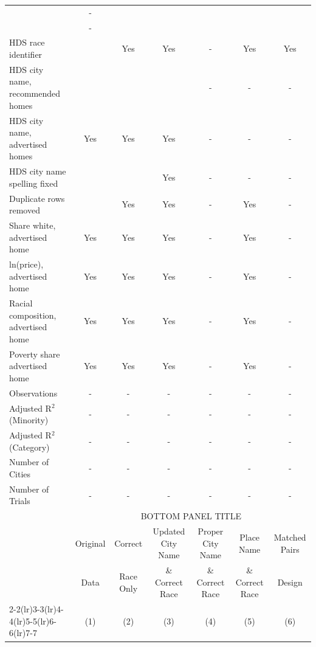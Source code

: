 \begin{table}[htbp]
{\begin{tabular}{l*{6}{c}}
                    &   -   &       &     &      &      &  \\
                    & -   &    &    &   &   &  \\
\midrule
HDS race identifier & & Yes & Yes & - & Yes & Yes \\
HDS city name, recommended homes &  &  & &- & - & -\\
HDS city name, advertised homes & Yes & Yes & Yes & - & - & -\\
HDS city name spelling fixed & & & Yes & - & - & -\\
Duplicate rows removed &  & Yes & Yes & - & Yes & - \\
\midrule
Share white, advertised home  & Yes & Yes & Yes & - & Yes & - \\
ln(price), advertised home  & Yes & Yes & Yes & - & Yes & - \\
Racial composition, advertised home & Yes & Yes & Yes & - & Yes & - \\
Poverty share advertised home & Yes & Yes & Yes & - & Yes & - \\
Observations        &        -   &        -   &        -   &        -   &        -   & - \\
Adjusted R$^2$ (Minority)    &     -   &     -   &     -   &     -   &     -   & - \\
Adjusted R$^2$ (Category)     &     -   &     -   &     -   &     -   &     -   & - \\
Number of Cities    &        -   &        -   &         -   &         -   &         -   & - \\
Number of Trials & - & - & - & - & - & - \\
\bottomrule
\toprule
& \multicolumn{6}{c}{BOTTOM PANEL TITLE}\\
\toprule
                    &\multicolumn{1}{c}{Original}&\multicolumn{1}{c}{Correct}&\multicolumn{1}{c}{Updated City Name}&\multicolumn{1}{c}{Proper City Name}&\multicolumn{1}{c}{Place Name}&\multicolumn{1}{c}{Matched Pairs}\\
                      &\multicolumn{1}{c}{Data}&\multicolumn{1}{c}{Race Only}&\multicolumn{1}{c}{\& Correct Race}&\multicolumn{1}{c}{\& Correct Race}&\multicolumn{1}{c}{\& Correct Race}&\multicolumn{1}{c}{Design}\\                  
                    \cmidrule(lr){2-2}\cmidrule(lr){3-3}\cmidrule(lr){4-4}\cmidrule(lr){5-5}\cmidrule(lr){6-6}\cmidrule(lr){7-7}
                    &\multicolumn{1}{c}{(1)}   &\multicolumn{1}{c}{(2)}   &\multicolumn{1}{c}{(3)}   &\multicolumn{1}{c}{(4)}   &\multicolumn{1}{c}{(5)}   &\multicolumn{1}{c}{(6)}\\

\end{tabular}}
\end{table}
